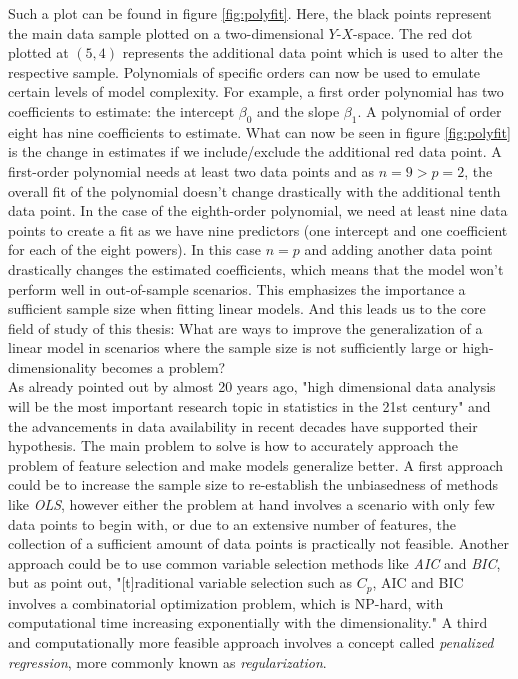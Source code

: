 \documentclass[12pt,a4paper]{article}
\begin{document}
Such a plot can be found in figure \ref{fig:polyfit}. Here, the black points represent the main data sample plotted on a two-dimensional $Y$-$X$-space. The red dot plotted at $(5,4)$ represents the additional data point which is used to alter the respective sample. Polynomials of specific orders can now be used to emulate certain levels of model complexity. For example, a first order polynomial has two coefficients to estimate: the intercept $\beta_0$ and the slope $\beta_1$. A polynomial of order eight has nine coefficients to estimate. What can now be seen in figure \ref{fig:polyfit} is the change in estimates if we include/exclude the additional red data point. A first-order polynomial needs at least two data points and as $n=9 > p = 2$, the overall fit of the polynomial doesn't change drastically with the additional tenth data point. In the case of the eighth-order polynomial, we need at least nine data points to create a fit as we have nine predictors (one intercept and one coefficient for each of the eight powers). In this case $n=p$ and adding another data point drastically changes the estimated coefficients, which means that the model won't perform well in out-of-sample scenarios. This emphasizes the importance a sufficient sample size when fitting linear models. And this leads us to the core field of study of this thesis: What are ways to improve the generalization of a linear model in scenarios where the sample size is not sufficiently large or high-dimensionality becomes a problem?\\

As already pointed out by \textcite{FanLi2006} almost 20 years ago, "high dimensional data analysis will be the most important research topic in statistics in the 21st century" and the advancements in data availability in recent decades have supported their hypothesis. The main problem to solve is how to accurately approach the problem of feature selection and make models generalize better. A first approach could be to increase the sample size to re-establish the unbiasedness of methods like \textit{OLS}, however either the problem at hand involves a scenario with only few data points to begin with, or due to an extensive number of features, the collection of a sufficient amount of data points is practically not feasible. Another approach could be to use common variable selection methods like \textit{AIC} and \textit{BIC}, but as \textcite{FanLi2006} point out, "[t]raditional variable selection such as $C_p$, AIC and BIC involves a combinatorial optimization problem, which is NP-hard, with computational time increasing exponentially with the dimensionality." A third and computationally more feasible approach involves a concept called \textit{penalized regression}, more commonly known as \textit{regularization}.
\end{document}
